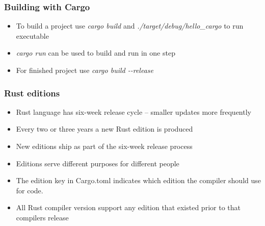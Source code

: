 \documentclass{beamer}
\begin{document}
\begin{frame}
    \frametitle{Building with Cargo}
   	\begin{itemize}
        \item To build a project use \textit{cargo build} and \textit{./target/debug/hello\_cargo} to run executable
        \vspace{\baselineskip}
        \item \textit{cargo run} can be used to build and run in one step
        \vspace{\baselineskip}
        \item For finished project use \textit{cargo build -{}-release}
    \end{itemize}
\end{frame}

\begin{frame}
    \frametitle{Rust editions}
    \begin{itemize}
        \item Rust language has six-week release cycle -- smaller updates more frequently
        \item Every two or three years a new Rust edition is produced
        \item New editions ship as part of the six-week release process
        \item Editions serve different purposes for different people
        \item The edition key in Cargo.toml indicates which edition the compiler should use for code.
        \item All Rust compiler version support any edition that existed prior to that compilers release
    \end{itemize}
\end{frame}



\begin{frame}

\end{frame}
\end{document}
